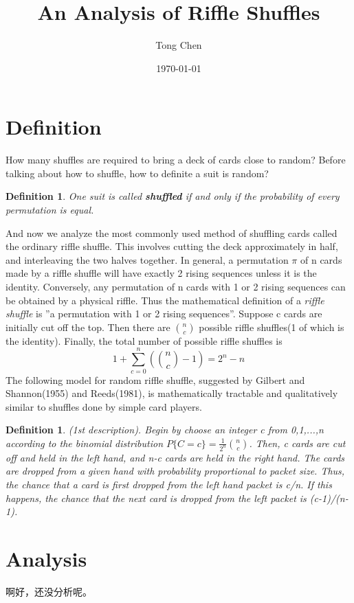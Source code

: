 \documentclass{article}
\title{An Analysis of Riffle Shuffles}
\author{Tong Chen}
\date{\today}
\newtheorem{definition}[theorem]{Definition}
\begin{document}
    \maketitle
\section{Definition}
How many shuffles are required to bring a deck of cards close to random? Before talking about how to shuffle, how to definite a suit is random?
\begin{definition}
One suit is called \textbf{shuffled} if and only if the probability of every permutation is equal.
\end{definition}
And now we analyze the most commonly used method of shuffling cards called the ordinary riffle shuffle. This involves cutting the deck approximately in half, and interleaving the two halves together.
In general, a permutation $\pi$ of n cards made by a riffle shuffle will have exactly 2 rising sequences unless it is the identity. Conversely, any permutation of n cards with 1 or 2 rising sequences can be obtained by a physical riffle. Thus the mathematical definition of a \textit{riffle shuffle} is ''a permutation with 1 or 2 rising sequences''. Suppose c cards are initially cut off the top. Then there are $n \choose c$ possible riffle shuffles(1 of which is the identity). Finally, the total number of possible riffle shuffles is
$$1+\sum_{c=0}^n ({n\choose c}-1)=2^n-n$$
The following model for random riffle shuffle, suggested by Gilbert and Shannon(1955) and Reeds(1981), is mathematically tractable and qualitatively similar to shuffles done by simple card players.
\begin{definition}
(1st description). Begin by choose an integer c from 0,1,...,n according to the binomial distribution $P\{C=c\}=\frac{1}{2^n} {n \choose c}$. Then, c cards are cut off and held in the left hand, and n-c cards are held in the right hand. The cards are dropped from a given hand with probability proportional to packet size. Thus, the chance that a card is first dropped from the left hand packet is c/n. If this happens, the chance that the next card is dropped from the left packet is (c-1)/(n-1).
\end{definition}
\section{Analysis}
啊好，还没分析呢。
\end{document}
